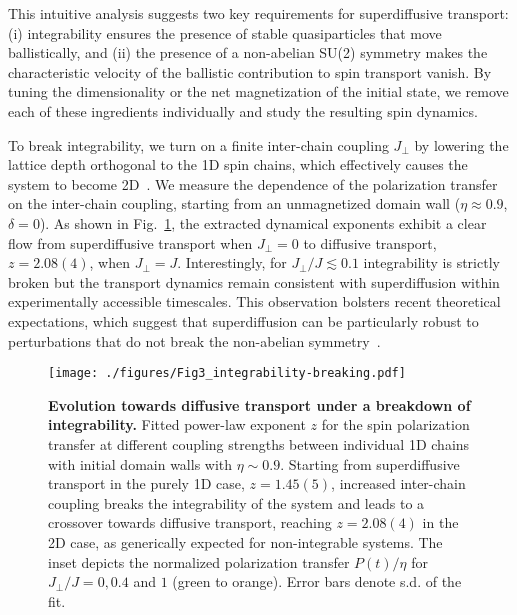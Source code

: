 \documentclass[
 reprint,
 superscriptaddress,
 amsmath,amssymb,
 aps,
 pra,
]{revtex4-2}
\begin{document}
This intuitive analysis suggests two key requirements for superdiffusive transport:
(i) integrability ensures the presence of stable quasiparticles that move ballistically, and
(ii) the presence of a non-abelian SU(2) symmetry makes the characteristic velocity of the ballistic contribution to spin transport vanish.
%
By tuning the dimensionality or the net magnetization of the initial state, we remove each of these ingredients individually and study the resulting spin dynamics.



To break integrability, we turn on a finite inter-chain coupling $J_\perp$ by lowering the lattice depth orthogonal to the 1D spin chains, which effectively causes the system to become 2D~\cite{Tang2018,Nichols2019}.
%
We measure the dependence of the polarization transfer on the inter-chain coupling, starting from an unmagnetized domain wall ($\eta \approx 0.9$, $\delta = 0$). As shown in Fig.~\ref{fig:3}, the extracted dynamical exponents exhibit a clear flow from superdiffusive transport when $J_\perp = 0$ to diffusive transport, $z = 2.08(4)$, when $J_\perp = J$.
%
Interestingly, for $J_\perp / J \lesssim 0.1$ integrability is strictly broken but the transport dynamics remain consistent with superdiffusion within experimentally accessible timescales.
%
This observation bolsters recent theoretical expectations, which suggest that superdiffusion can be particularly robust to perturbations that do not break the non-abelian symmetry~\cite{DeNardis2021}.

\begin{figure}
    \centering
    \texttt{[image: ./figures/Fig3\_integrability-breaking.pdf]}
    \caption{\textbf{Evolution towards diffusive transport under a breakdown of integrability.}
        Fitted power-law exponent $z$ for the spin polarization transfer at different coupling strengths between individual 1D chains with initial domain walls with $\eta \sim 0.9$. Starting from superdiffusive transport in the purely 1D case, $z = 1.45 (5)$, increased inter-chain coupling breaks the integrability of the system and leads to a crossover towards diffusive transport, reaching $z = 2.08 (4)$ in the 2D case, as generically expected for non-integrable systems.
        The inset depicts the normalized polarization transfer $P(t) / \eta$ for $J_\perp / J = 0, 0.4$ and $1$ (green to orange).
        Error bars denote s.d. of the fit.
    }
    \label{fig:3}
\end{figure}
\end{document}
